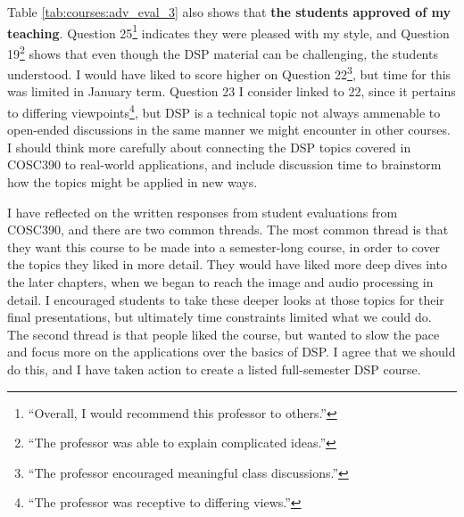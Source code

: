 \documentclass[../../main.tex]{subfiles}
\begin{document}
Table \ref{tab:courses:adv_eval_3} also shows that \textbf{the students approved of my teaching}.  Question 25\footnote{``Overall, I would recommend this professor to others.''} indicates they were pleased with my style, and Question 19\footnote{``The professor was able to explain complicated ideas.''} shows that even though the DSP material can be challenging, the students understood.  I would have liked to score higher on Question 22\footnote{``The professor encouraged meaningful class discussions.''}, but time for this was limited in January term.  Question 23 I consider linked to 22, since it pertains to differing viewpoints\footnote{``The professor was receptive to differing views.''}, but DSP is a technical topic not always ammenable to open-ended discussions in the same manner we might encounter in other courses.  I should think more carefully about connecting the DSP topics covered in COSC390 to real-world applications, and include discussion time to brainstorm how the topics might be applied in new ways. \\ \hspace{0.1cm}

I have reflected on the written responses from student evaluations from COSC390, and there are two common threads.  The most common thread is that they want this course to be made into a semester-long course, in order to cover the topics they liked in more detail.  They would have liked more deep dives into the later chapters, when we began to reach the image and audio processing in detail.  I encouraged students to take these deeper looks at those topics for their final presentations, but ultimately time constraints limited what we could do.  The second thread is that people liked the course, but wanted to slow the pace and focus more on the applications over the basics of DSP.  I agree that we should do this, and I have taken action to create a listed full-semester DSP course. \\ \hspace{0.1cm}
\end{document}
